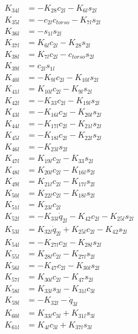 \begin{multicols}{2}
\begin{align}
K_{34l} &= - K_{28}c_{2l} - K_{6l}s_{2l} \nonumber \\
K_{35l} &= - c_{2l}c_{torso} - K_{7l}s_{2l} \nonumber \\
K_{36l} &= -s_{1l}s_{2l} \nonumber \\
K_{37l} &= K_{6l}c_{2l} - K_{28}s_{2l} \nonumber \\
K_{38l} &= K_{7l}c_{2l} - c_{torso}s_{2l} \nonumber \\
K_{39l} &= c_{2l}s_{1l} \nonumber \\
K_{40l} &= - K_{9l}c_{2l} - K_{10l}s_{2l} \nonumber \\
K_{41l} &= K_{10l}c_{2l} - K_{9l}s_{2l} \nonumber \\
K_{42l} &= - K_{33}c_{2l} - K_{19l}s_{2l} \nonumber \\
K_{43l} &= - K_{16l}c_{2l} - K_{20l}s_{2l} \nonumber \\
K_{44l} &= - K_{17l}c_{2l} - K_{21l}s_{2l} \nonumber \\
K_{45l} &= - K_{18l}c_{2l} - K_{22l}s_{2l} \nonumber \\
K_{46l} &= -K_{23l}s_{2l} \nonumber \\
K_{47l} &= K_{19l}c_{2l} - K_{33}s_{2l} \nonumber \\
K_{48l} &= K_{20l}c_{2l} - K_{16l}s_{2l} \nonumber \\
K_{49l} &= K_{21l}c_{2l} - K_{17l}s_{2l} \nonumber \\
K_{50l} &= K_{22l}c_{2l} - K_{18l}s_{2l} \nonumber \\
K_{51l} &= K_{23l}c_{2l} \nonumber \\
K_{52l} &= - K_{33l}\dot{q}_{2l} - K_{42}c_{2l} - K_{25l}s_{2l} \nonumber \\
K_{53l} &= K_{32l}\dot{q}_{2l} + K_{25l}c_{2l} - K_{42}s_{2l} \nonumber \\
K_{54l} &= - K_{27l}c_{2l} - K_{28l}s_{2l} \nonumber \\
K_{55l} &= K_{28l}c_{2l} - K_{27l}s_{2l} \nonumber \\
K_{56l} &= - K_{47}c_{2l} - K_{30l}s_{2l} \nonumber \\
K_{57l} &= K_{30l}c_{2l} - K_{47}s_{2l} \nonumber \\
K_{58l} &= K_{33l}s_{3l} - K_{31l}c_{3l} \nonumber \\
K_{59l} &= - K_{32l} - \dot{q}_{3l} \nonumber \\
K_{60l} &= K_{33l}c_{3l} + K_{31l}s_{3l} \nonumber \\
K_{61l} &= K_{4l}c_{3l} + K_{37l}s_{3l} \nonumber \\

\end{align}
\end{multicols}
